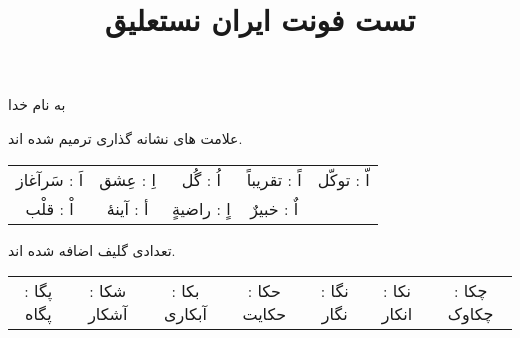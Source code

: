 \documentclass[14pt,a4paper]{article}
\begin{document}
\title{تست فونت ایران نستعلیق}
\author{ }\date{ }
\maketitle

\begin{center}
به نام خدا
\end{center}

علامت های نشانه گذاری ترمیم شده اند.

\vspace{3mm}
\begin{tabular}{c c c c c}
 اَ : سَرآغاز & اِ : عِشق & اُ :‌ گُل & اً : تقریباً & اّ : توکّل \\
  اْ : قلْب & أ : آینهٔ & اٍ : راضیةٍ & اٌ : خبیرٌ & 
\end{tabular}
\vspace{3mm}

تعدادی گلیف اضافه شده اند.

\vspace{3mm}
\begin{tabular}{c c c c c c c}
پگا : پگاه & شکا : آشکار & بکا : آبکاری & حکا : حکایت & نگا : نگار & نکا : انکار & چکا : چکاوک \\
\end{tabular}
\vspace{3mm}
\end{document}
